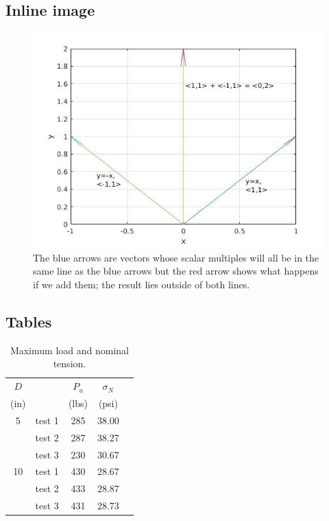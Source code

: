 \documentclass[MathsNotesBase.tex]{subfiles}
\begin{document}
	\subsection{Inline image}
	\begin{figure}[h!]
		\includegraphics[width=\linewidth]{resources/img/not_closed_under_addition.png}
		\caption{The blue arrows are vectors whose scalar multiples will all be in the same line as the blue arrows but the red arrow shows what happens if we add them; the result lies outside of both lines.}
	\end{figure}
	
	\subsection{Tables}
	\begin{table}[h!]%
		\caption{Maximum load and nominal tension.}
		\label{aggiungi}\centering%
		\begin{tabular}{clccc}
			\toprule%
			$D$ & & $P_u$ & $\sigma_N$ \\
			(in)& &(lbs) & (psi) \\ \toprule%
			5 & test 1 & 285 & 38.00 \\
			& test 2 & 287 & 38.27 \\
			& test 3 & 230 & 30.67 \\ \midrule
			10 & test 1 & 430 & 28.67 \\
			& test 2 & 433 & 28.87 \\
			& test 3 & 431 & 28.73 \\ \bottomrule
		\end{tabular}
	\end{table}
	
\end{document}

